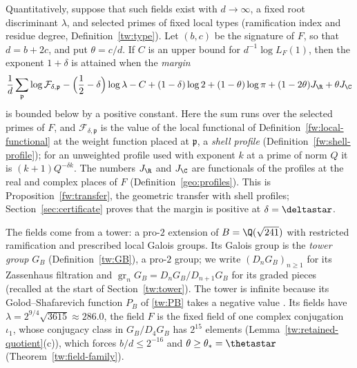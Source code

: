 Quantitatively, suppose that such fields exist with $d\to\infty$, a
fixed root discriminant $\lambda$, and selected primes of fixed local
types (ramification index and residue degree, Definition~\ref{tw:type}). Let $(b,c)$ be the signature of $F$, so that $d=b+2c$, and put
$\theta=c/d$. If $C$ is an upper bound for $d^{-1}\log L_F(1)$, then
the exponent $1+\delta$ is attained when the \emph{margin}
\begin{equation}\label{intro:margin}
 \frac1d\sum_{\mathfrak p}\log\mathcal F_{\delta,\mathfrak p}
 -\Bigl(\frac12-\delta\Bigr)\log\lambda-C+(1-\delta)\log2
 +(1-\theta)\log\pi+(1-2\theta)J_\R+\theta J_\C
\end{equation}
is bounded below by a positive constant. Here the sum runs over the
selected primes of $F$, and $\mathcal F_{\delta,\mathfrak p}$ is the value
of the local functional of Definition~\ref{fw:local-functional} at the
weight function placed at $\mathfrak p$, a \emph{shell profile}
(Definition~\ref{fw:shell-profile}); for an unweighted profile used with exponent $k$
at a prime of norm $Q$ it is $(k+1)Q^{-\delta k}$. The numbers $J_\R$ and
$J_\C$ are functionals of the profiles at the real and complex places of
$F$ (Definition~\ref{geo:profiles}). This is
Proposition~\ref{fw:transfer}, the geometric transfer with shell
profiles; Section~\ref{sec:certificate} proves that the margin is
positive at $\delta=\deltastar$.

The fields come from a tower: a pro-$2$ extension of
$B=\Q(\sqrt{241})$ with restricted ramification and prescribed local
Galois groups. Its Galois group is the \emph{tower group} $G_B$
(Definition~\ref{tw:GB}), a pro-$2$ group; we write $(D_nG_B)_{n\ge1}$ for its
Zassenhaus filtration and $\operatorname{gr}_nG_B=D_nG_B/D_{n+1}G_B$ for its
graded pieces (recalled at the start of Section~\ref{tw:tower}). The tower is
infinite because its Golod--Shafarevich function
$P_B$ of \eqref{tw:PB} takes a negative value
\cite{GolodShafarevich,HajirMaireRamakrishna2021Cutting}. Its fields
have $\lambda=2^{9/4}\sqrt{3615}\approx286.0$, the field $F$ is the fixed
field of one complex conjugation $\iota_1$, whose conjugacy class in
$G_B/D_4G_B$ has $2^{15}$ elements (Lemma~\ref{tw:retained-quotient}(c)),
which forces $b/d\le2^{-16}$ and $\theta\ge\theta_*=\thetastar$
(Theorem~\ref{tw:field-family}).

